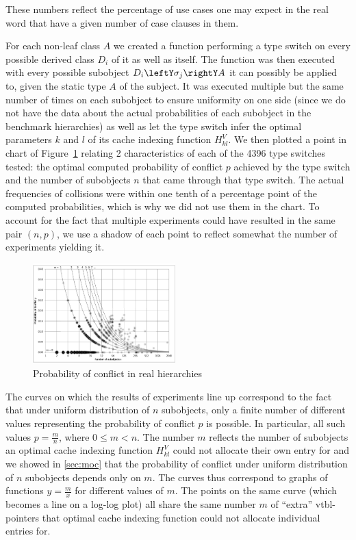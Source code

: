 \noindent
These numbers reflect the percentage of use cases one may expect in the real 
word that have a given number of case clauses in them.

For each non-leaf class $A$ we created a function performing a type switch on 
every possible derived class $D_i$ of it as well as itself. The function was 
then executed with every possible subobject $D_i\leftY\sigma_j\rightY A$ it can  
possibly be applied to, given the static type $A$ of the subject. It was 
executed multiple but the same number of times on each subobject to ensure 
uniformity on one side (since we do not have the data about the actual 
probabilities of each subobject in the benchmark hierarchies) as well as let the 
type switch infer the optimal parameters $k$ and $l$ of its cache indexing 
function $H_{kl}^V$. We then plotted a point in chart of Figure~\ref{fig:prob} 
relating 2 characteristics of each of the 4396 type switches tested: the optimal 
computed probability of conflict $p$ achieved by the type switch and the number 
of subobjects $n$ that came through that type switch. The actual frequencies of 
collisions were within one tenth of a percentage point of the computed 
probabilities, which is why we did not use them in the chart. To account for the 
fact that multiple experiments could have resulted in the same pair $(n,p)$, we 
use a shadow of each point to reflect somewhat the number of experiments 
yielding it.

\begin{figure}[htbp]
  \centering
    \includegraphics[width=0.49\textwidth]{ClassHierarchies.pdf}
  \caption{Probability of conflict in real hierarchies}
  \label{fig:prob}
\end{figure}

The curves on which the results of experiments line up correspond to the fact 
that under uniform distribution of $n$ subobjects, only a finite number of 
different values representing the probability of conflict $p$ is possible. In 
particular, all such values $p=\frac{m}{n}$, where $0 \le m < n$. The number $m$ 
reflects the number of subobjects an optimal cache indexing function $H_{kl}^V$ 
could not allocate their own entry for and we showed in \textsection\ref{sec:moc} 
that the probability of conflict under uniform distribution of $n$ subobjects 
depends only on $m$. The curves thus correspond to graphs of functions 
$y=\frac{m}{x}$ for different values of $m$. The points on the same curve (which 
becomes a line on a log-log plot) all share the same number $m$ of ``extra'' 
vtbl-pointers that optimal cache indexing function could not allocate individual 
entries for.

